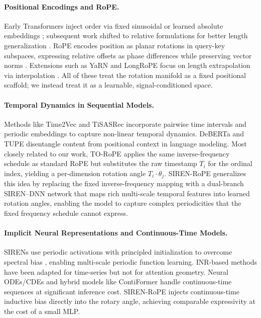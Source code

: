 \documentclass{article}
\begin{document}
\paragraph{Positional Encodings and RoPE.}
Early Transformers inject order via fixed sinusoidal or learned absolute embeddings \citep{vaswani2017attention}; subsequent work shifted to relative formulations for better length generalization \citep{shaw2018relative, dai2019transformerxl, raffel2020t5}. RoPE encodes position as planar rotations in query-key subspaces, expressing relative offsets as phase differences while preserving vector norms \citep{su2024roformer}. Extensions such as YaRN and LongRoPE focus on length extrapolation via interpolation \citep{peng2023yarn, zhang2024longrope}. All of these treat the rotation manifold as a fixed positional scaffold; we instead treat it as a learnable, signal-conditioned space.

\paragraph{Temporal Dynamics in Sequential Models.}
Methods like Time2Vec \citep{kazemi2019time2vec} and TiSASRec \citep{li2020tisasrec} incorporate pairwise time intervals and periodic embeddings to capture non-linear temporal dynamics. DeBERTa \citep{he2020deberta} and TUPE \citep{ke2020tupe} disentangle content from positional context in language modeling. Most closely related to our work, TO-RoPE \citep{shirkavand2025torope} applies the same inverse-frequency schedule as standard RoPE but substitutes the raw timestamp $T_i$ for the ordinal index, yielding a per-dimension rotation angle $T_i \cdot \theta_j$. SIREN-RoPE generalizes this idea by replacing the fixed inverse-frequency mapping with a dual-branch SIREN--DNN network that maps rich multi-scale temporal features into learned rotation angles, enabling the model to capture complex periodicities that the fixed frequency schedule cannot express.

\paragraph{Implicit Neural Representations and Continuous-Time Models.}
SIRENs \citep{sitzmann2020siren} use periodic activations with principled initialization to overcome spectral bias \citep{tancik2020fourier}, enabling multi-scale periodic function learning. INR-based methods have been adapted for time-series \citep{fons2022hypertime, lenaour2024inrts} but not for attention geometry. Neural ODEs/CDEs \citep{chen2018neuralode, kidger2020neuralcde} and hybrid models like ContiFormer \citep{chen2024contiformer} handle continuous-time sequences at significant inference cost. SIREN-RoPE injects continuous-time inductive bias directly into the rotary angle, achieving comparable expressivity at the cost of a small MLP.
\end{document}
